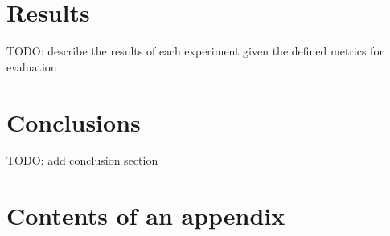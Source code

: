 \documentclass[english, 12pt, a4paper, elec, utf8, a-2b, online]{aaltothesis}
\begin{document}
\clearpage
\section{Results}

TODO: describe the results of each experiment given the defined metrics for evaluation

\clearpage

\section{Conclusions}
\label{sec:summary}

TODO: add conclusion section


\clearpage
\thesisbibliography




\clearpage

\thesisappendix

\section{Contents of an appendix}
\label{app:contents}
\end{document}
